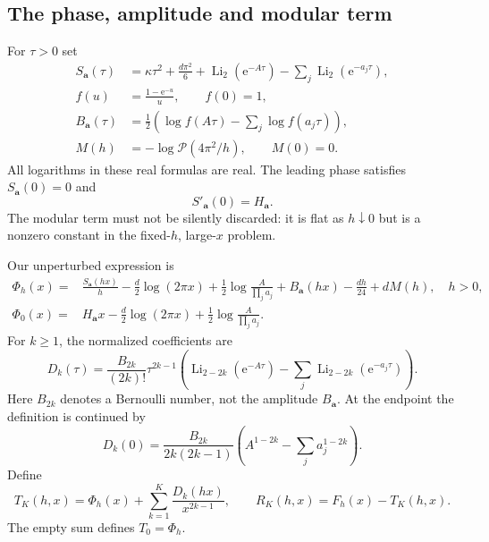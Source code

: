 \documentclass[11pt,a4paper]{article}
\numberwithin{equation}{section}
\theoremstyle{definition}\newtheorem{definition}[theorem]{Definition}
\theoremstyle{remark}\newtheorem{remark}[theorem]{Remark}
\DeclareMathOperator{\Li}{Li}
\newcommand{\e}{\mathrm e}
\newcommand{\avec}{\boldsymbol a}
\newcommand{\calP}{\mathcal P}
\begin{document}
\subsection{The phase, amplitude and modular term}
For $\tau>0$ set
\begin{align}
 S_{\avec}(\tau)
 &=\kappa\tau^2+\frac{d\pi^2}{6}
   +\Li_2(\e^{-A\tau})-\sum_j\Li_2(\e^{-a_j\tau}),\label{eq:S}\\
 f(u)&=\frac{1-\e^{-u}}{u},\qquad f(0)=1,\label{eq:f}\\
 B_{\avec}(\tau)
 &=\frac12\left(\log f(A\tau)-\sum_j\log f(a_j\tau)\right),\label{eq:B}\\
 M(h)&=-\log\calP(4\pi^2/h),\qquad M(0)=0.\label{eq:M}
\end{align}
All logarithms in these real formulas are real. The leading phase satisfies
$S_{\avec}(0)=0$ and
\begin{equation}
 S'_{\avec}(0)=H_{\avec}.
 \label{eq:S-endpoint}
\end{equation}
The modular term must not be silently discarded: it is flat as $h\downarrow0$
but is a nonzero constant in the fixed-$h$, large-$x$ problem.

Our unperturbed expression is
\begin{align}
 \Phi_h(x)={}&\frac{S_{\avec}(hx)}{h}
 -\frac d2\log(2\pi x)+\frac12\log\frac{A}{\prod_j a_j}
 +B_{\avec}(hx)-\frac{dh}{24}+dM(h),\quad h>0,\label{eq:core}\\
 \Phi_0(x)={}&H_{\avec}x-\frac d2\log(2\pi x)
              +\frac12\log\frac{A}{\prod_j a_j}.\label{eq:core-zero}
\end{align}
For $k\ge1$, the normalized coefficients are
\begin{equation}
 D_k(\tau)=\frac{B_{2k}}{(2k)!}\tau^{2k-1}
 \left(\Li_{2-2k}(\e^{-A\tau})
            -\sum_j\Li_{2-2k}(\e^{-a_j\tau})\right).
 \label{eq:D}
\end{equation}
Here $B_{2k}$ denotes a Bernoulli number, not the amplitude $B_{\avec}$.
At the endpoint the definition is continued by
\begin{equation}
 D_k(0)=\frac{B_{2k}}{2k(2k-1)}
       \left(A^{1-2k}-\sum_j a_j^{1-2k}\right).
 \label{eq:Dzero}
\end{equation}
Define
\begin{equation}
 T_K(h,x)=\Phi_h(x)+\sum_{k=1}^K\frac{D_k(hx)}{x^{2k-1}},
 \qquad R_K(h,x)=F_h(x)-T_K(h,x).
 \label{eq:TK}
\end{equation}
The empty sum defines $T_0=\Phi_h$.
\end{document}
